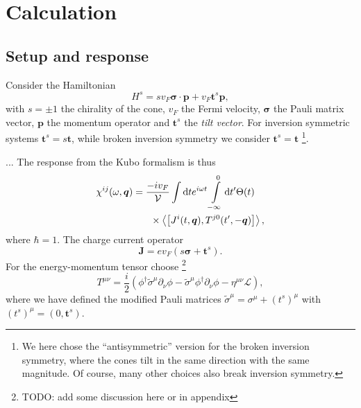 \documentclass[%
 reprint,
 amsmath,amssymb,
 aps,
]{revtex4-2}
\renewcommand\vec\bm  %
\begin{document}
\section{Calculation\label{sec:calculation}}
\subsection{Setup and response}
Consider the Hamiltonian
\begin{equation}
  \label{eq:hamiltonian}
  H^s = s v_F \vec{\sigma} \cdot \vec{p} + v_F \vec{t}^s \vec{p},
\end{equation}
with \( s = \pm 1 \) the chirality of the cone, \( v_F \) the Fermi velocity, \( \vec{\sigma} \) the Pauli matrix vector, \( \vec{p} \) the momentum operator and \( \vec{t}^s \) the \emph{tilt vector}.
For inversion symmetric systems \( \vec{t}^s = s \vec{t} \), while broken inversion symmetry we consider \( \vec{t}^s = \vec{t} \)
\footnote{We here chose the ``antisymmetric'' version for the broken inversion symmetry, where the cones tilt in the same direction with the same magnitude.
Of course, many other choices also break inversion symmetry.}.

...
The response from the Kubo formalism is thus
\begin{equation}
  \label{eq:kubo-response}
  \begin{multlined}
    \chi^{ij}(\omega, \vec{q}) = \frac{-i v_F}{\mathcal{V}}
    \int \mathrm{d} t
    e^{i \omega t}
    \int\limits_{-\infty}^0 \mathrm{d} t'
    \Theta(t)\\
    \times
    \Braket{\left[J^i(t, \vec{q}), T^{j0}(t', -\vec{q})\right]},
  \end{multlined}
\end{equation}
where \( \hbar = 1 \).
The charge current operator
\begin{equation}
  \label{eq:current-op}
  \vec{J} = e v_F (s \vec{\sigma} + \vec{t}^s).
\end{equation}
For the energy-momentum tensor choose
\footnote{TODO: add some discussion here or in appendix}
\begin{equation}
  \label{eq:energy-momentum-tensor}
  T^{\mu\nu} =
  \frac{i}{2} (
  \phi^{\dagger} \tilde{\sigma}^{\mu} \partial_{\nu} \phi
  -\tilde{\sigma} ^{\mu} \phi^{\dagger} \partial_{\nu} \phi
  -\eta^{\mu \nu} \mathcal{L}
  ),
\end{equation}
where we have defined the modified Pauli matrices \( \tilde{\sigma} ^{\mu} = \sigma^{\mu} + (t^s)^{\mu} \) with \( (t^s)^{\mu} = (0, \vec{t}^s) \).
\end{document}
